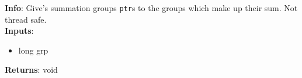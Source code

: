 \textbf{Info}: Give's summation groups \texttt{ptr}s to the groups which
make up their sum. Not thread safe. \\

\noindent \textbf{Inputs}:
\begin{itemize}
\item{long grp}
\end{itemize}

\noindent \textbf{Returns}: void
